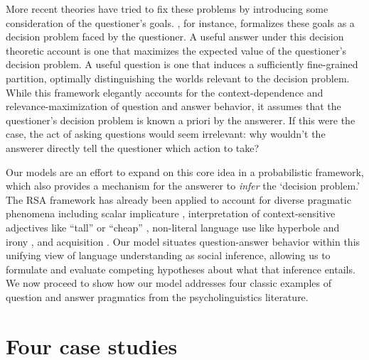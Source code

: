 \documentclass[12pt, floatsintext, jou]{apa6}
\begin{document}
More recent theories have tried to fix these problems by introducing some consideration of the questioner's goals. , for instance, formalizes these goals as a decision problem faced by the questioner. A useful answer under this decision theoretic account is one that maximizes the expected value of the questioner's decision problem. A useful question is one that induces a sufficiently fine-grained partition, optimally distinguishing the worlds relevant to the decision problem. While this framework elegantly accounts for the context-dependence and relevance-maximization of question and answer behavior, it assumes that the questioner's decision problem is known a priori by the answerer.  If this were the case, the act of asking questions would seem irrelevant: why wouldn't the answerer directly tell the questioner which action to take?

Our models are an effort to expand on this core idea in a probabilistic framework, which also provides a mechanism for the answerer to \emph{infer} the `decision problem.' The RSA framework has already been applied to account for diverse pragmatic phenomena including scalar implicature \cite{GoodmanStuhlmuller13_KnowledgeImplicature}, interpretation of context-sensitive adjectives like ``tall'' or ``cheap'' \cite{LassiterGoodman15_AdjectivalVagueness}, non-literal language use like hyperbole \cite{KaoWuBergenGoodman14_NonliteralNumberWords} and irony \cite{KaoGoodman15_IronyCogSci}, and acquisition \cite{FrankGoodman14_InferringWordMeanings}. Our model situates question-answer behavior within this unifying view of language understanding as social inference, allowing us to formulate and evaluate competing hypotheses about what that inference entails. We now proceed to show how our model addresses four classic examples of question and answer pragmatics from the psycholinguistics literature.

\section{Four case studies}

\end{document}
